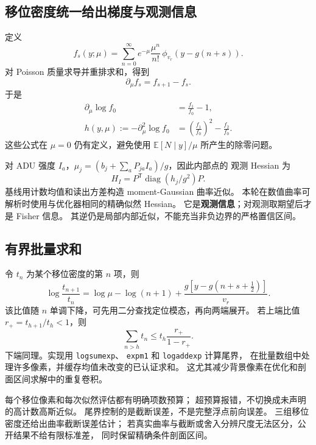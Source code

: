 \documentclass[UTF8,11pt,a4paper,fontset=fandol]{ctexart}
\newcommand{\diag}{\operatorname{diag}}
\newcommand{\T}{^{\mathsf T}}
\begin{document}
\subsection{移位密度统一给出梯度与观测信息}

定义
\begin{equation}
f_s(y;\mu)=\sum_{n=0}^{\infty}
e^{-\mu}\frac{\mu^n}{n!}\,
\phi_{v_r}\!\left(y-g(n+s)\right).
\end{equation}
对 Poisson 质量求导并重排求和，得到
\begin{equation}
\partial_\mu f_s=f_{s+1}-f_s.
\end{equation}
于是
\begin{align}
\partial_\mu\log f_0&=\frac{f_1}{f_0}-1,\\
h(y,\mu):=-\partial_\mu^2\log f_0
&=\left(\frac{f_1}{f_0}\right)^2-\frac{f_2}{f_0}.
\end{align}
这些公式在 $\mu=0$ 仍有定义，避免使用 $\mathbb E[N\mid y]/\mu$
所产生的除零问题。

对 ADU 强度 $I_a$，$\mu_j=(b_j+\sum_aP_{ja}I_a)/g$，因此内部点的
观测 Hessian 为
\begin{equation}
H_I=P\T\diag(h_j/g^2)P.
\end{equation}
基线用计数均值和读出方差构造 moment-Gaussian 曲率近似。
本轮在数值曲率可解析时使用与优化器相同的精确似然 Hessian。
它是\textbf{观测信息}；对观测取期望后才是 Fisher 信息。
其逆仍是局部内部近似，不能充当非负边界的严格置信区间。

\subsection{有界批量求和}

令 $t_n$ 为某个移位密度的第 $n$ 项，则
\begin{equation}
\log\frac{t_{n+1}}{t_n}
=\log\mu-\log(n+1)+\frac{g[y-g(n+s+\tfrac12)]}{v_r}.
\end{equation}
该比值随 $n$ 单调下降，可先用二分查找定位模态，再向两端展开。
若上端比值 $r_+=t_{h+1}/t_h<1$，则
\begin{equation}
\sum_{n>h}t_n\leq t_h\frac{r_+}{1-r_+}.
\end{equation}
下端同理。实现用 \texttt{logsumexp}、
\texttt{expm1} 和 \texttt{logaddexp} 计算尾界，
在批量数组中处理许多像素，并缓存均值未改变的已认证求和。
这尤其减少背景像素在优化和剖面区间求解中的重复卷积。

每个移位像素和每次似然评估都有明确项数预算；
超预算报错，不切换成未声明的高计数高斯近似。
尾界控制的是截断误差，不是完整浮点前向误差。
三组移位密度还给出曲率截断误差估计；
若真实曲率与截断或舍入分辨尺度无法区分，公开结果不给有限标准差，
同时保留精确条件剖面区间。
\end{document}
